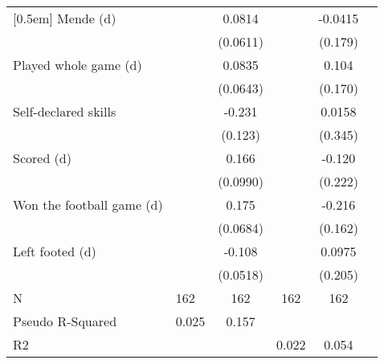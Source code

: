 {\begin{tabularx}{\textwidth}{Xl*{4}{c}}
[0.5em]
Mende (d)           &                     &      0.0814         &                     &     -0.0415         \\
                    &                     &    (0.0611)         &                     &     (0.179)         \\
[0.5em]
Played whole game (d)&                     &      0.0835         &                     &       0.104         \\
                    &                     &    (0.0643)         &                     &     (0.170)         \\
[0.5em]
Self-declared skills&                     &      -0.231\sym{*}  &                     &      0.0158         \\
                    &                     &     (0.123)         &                     &     (0.345)         \\
[0.5em]
Scored (d)          &                     &       0.166\sym{*}  &                     &      -0.120         \\
                    &                     &    (0.0990)         &                     &     (0.222)         \\
[0.5em]
Won the football game (d)&                     &       0.175\sym{**} &                     &      -0.216         \\
                    &                     &    (0.0684)         &                     &     (0.162)         \\
[0.5em]
Left footed (d)     &                     &      -0.108\sym{**} &                     &      0.0975         \\
                    &                     &    (0.0518)         &                     &     (0.205)         \\
\hline
N                   &         162         &         162         &         162         &         162         \\
Pseudo R-Squared    &       0.025         &       0.157         &                     &                     \\
R2                  &                     &                     &       0.022         &       0.054         \\
\hline\hline
\end{tabularx}
}
